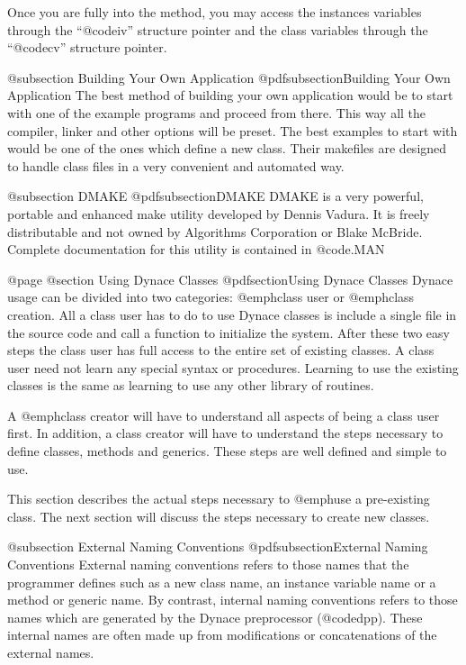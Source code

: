 Once you are fully into the method, you may access the instances
variables through the ``@code{iv}'' structure pointer and the
class variables through the ``@code{cv}'' structure pointer.



@subsection Building Your Own Application
@pdfsubsection{Building Your Own Application}
The best method of building your own application would be to start
with one of the example programs and proceed from there.  This way
all the compiler, linker and other options will be preset.  The best
examples to start with would be one of the ones which define a new
class.  Their makefiles are designed to handle class files in
a very convenient and automated way.

@subsection DMAKE
@pdfsubsection{DMAKE}
DMAKE is a very powerful, portable and enhanced make utility developed
by Dennis Vadura.  It is freely distributable and not owned by
Algorithms Corporation or Blake McBride.  Complete documentation for this utility
is contained in @code{\DYNACE\DOCS\DMAKE.MAN}





@page
@section Using Dynace Classes
@pdfsection{Using Dynace Classes}
Dynace usage can be divided into two categories: @emph{class user} or
@emph{class creation}.  All a class user has to do to use Dynace classes
is include a single file in the source code and call a function to
initialize the system.  After these two easy steps the class user has full
access to the entire set of existing classes.  A class user need not learn
any special syntax or procedures.  Learning to use the existing classes
is the same as learning to use any other library of routines.

A @emph{class creator} will have to understand all aspects of being a
class user first.  In addition, a class creator will have to understand
the steps necessary to define classes, methods and generics.  These
steps are well defined and simple to use.

This section describes the actual steps necessary to @emph{use} a
pre-existing class.  The next section will discuss the steps necessary
to create new classes.

@subsection External Naming Conventions
@pdfsubsection{External Naming Conventions}
External naming conventions refers to those names that the programmer
defines such as a new class name, an instance variable name or a method
or generic name.  By contrast, internal naming conventions refers to
those names which are generated by the Dynace preprocessor (@code{dpp}).
These internal names are often made up from modifications or
concatenations of the external names.

